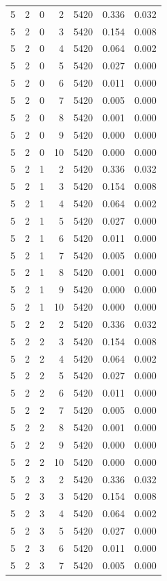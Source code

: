 \begin{table}
\begin{tabular}{rrrrrrr}
5 & 2 & 0 & 2 & 5420 & 0.336 & 0.032 \\
5 & 2 & 0 & 3 & 5420 & 0.154 & 0.008 \\
5 & 2 & 0 & 4 & 5420 & 0.064 & 0.002 \\
5 & 2 & 0 & 5 & 5420 & 0.027 & 0.000 \\
5 & 2 & 0 & 6 & 5420 & 0.011 & 0.000 \\
5 & 2 & 0 & 7 & 5420 & 0.005 & 0.000 \\
5 & 2 & 0 & 8 & 5420 & 0.001 & 0.000 \\
5 & 2 & 0 & 9 & 5420 & 0.000 & 0.000 \\
5 & 2 & 0 & 10 & 5420 & 0.000 & 0.000 \\
5 & 2 & 1 & 2 & 5420 & 0.336 & 0.032 \\
5 & 2 & 1 & 3 & 5420 & 0.154 & 0.008 \\
5 & 2 & 1 & 4 & 5420 & 0.064 & 0.002 \\
5 & 2 & 1 & 5 & 5420 & 0.027 & 0.000 \\
5 & 2 & 1 & 6 & 5420 & 0.011 & 0.000 \\
5 & 2 & 1 & 7 & 5420 & 0.005 & 0.000 \\
5 & 2 & 1 & 8 & 5420 & 0.001 & 0.000 \\
5 & 2 & 1 & 9 & 5420 & 0.000 & 0.000 \\
5 & 2 & 1 & 10 & 5420 & 0.000 & 0.000 \\
5 & 2 & 2 & 2 & 5420 & 0.336 & 0.032 \\
5 & 2 & 2 & 3 & 5420 & 0.154 & 0.008 \\
5 & 2 & 2 & 4 & 5420 & 0.064 & 0.002 \\
5 & 2 & 2 & 5 & 5420 & 0.027 & 0.000 \\
5 & 2 & 2 & 6 & 5420 & 0.011 & 0.000 \\
5 & 2 & 2 & 7 & 5420 & 0.005 & 0.000 \\
5 & 2 & 2 & 8 & 5420 & 0.001 & 0.000 \\
5 & 2 & 2 & 9 & 5420 & 0.000 & 0.000 \\
5 & 2 & 2 & 10 & 5420 & 0.000 & 0.000 \\
5 & 2 & 3 & 2 & 5420 & 0.336 & 0.032 \\
5 & 2 & 3 & 3 & 5420 & 0.154 & 0.008 \\
5 & 2 & 3 & 4 & 5420 & 0.064 & 0.002 \\
5 & 2 & 3 & 5 & 5420 & 0.027 & 0.000 \\
5 & 2 & 3 & 6 & 5420 & 0.011 & 0.000 \\
5 & 2 & 3 & 7 & 5420 & 0.005 & 0.000 \\

\end{tabular}
\end{table}

